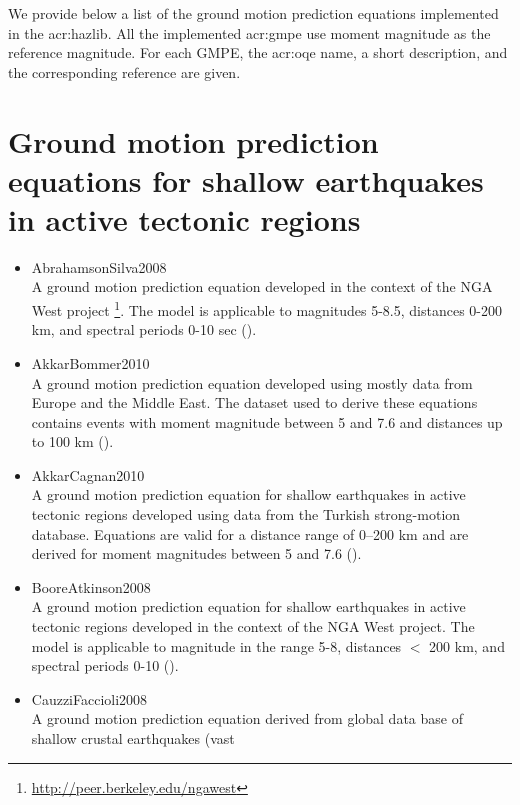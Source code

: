 \label{sec:gmpes_list}
We provide below a list of the ground motion prediction equations 
implemented in the \gls{acr:hazlib}. All the implemented \gls{acr:gmpe}
use moment magnitude as the reference magnitude. For each GMPE,
the \gls{acr:oqe} name, a short description, and the corresponding reference
are given.
%
\section{Ground motion prediction equations for shallow earthquakes 
    in active tectonic regions}
\begin{itemize} 
    \item AbrahamsonSilva2008 \hfill \\ A ground motion prediction equation 
        developed in the context of the NGA West project 
		\footnote{\href{http://peer.berkeley.edu/ngawest/}{http://peer.berkeley.edu/ngawest}}.
        The model is applicable to magnitudes 5-8.5, distances 0-200 km, and
        spectral periods 0-10 sec (\cite{abrahamson2008}).
    \item AkkarBommer2010 \hfill \\ A ground motion prediction equation 
        developed using mostly data from Europe and the Middle East. The 
		dataset 
        used to derive these equations contains events with moment 
        magnitude between 5 and 7.6 and distances up to 100 km 
		(\cite{akkar2010}).
    \item AkkarCagnan2010 \hfill \\ A ground motion prediction equation for 
		shallow
        earthquakes in active tectonic regions developed using data from the 
        Turkish strong-motion database. Equations are valid for a distance 
        range of 0–200 km and are derived for moment magnitudes 
        between 5 and 7.6 (\cite{akkar2010a}).
    \item BooreAtkinson2008 \hfill \\ A ground motion prediction equation 
        for shallow earthquakes in active tectonic regions developed in 
        the context of the NGA West project.
        The model is applicable to magnitude in the range 5-8, 
		distances $<$ 200 km,
        and spectral periods 0-10 (\cite{boore2008}).
    \item CauzziFaccioli2008 \hfill \\ A ground motion prediction equation 
        derived from global data base of shallow crustal earthquakes (vast 

\end{itemize}
